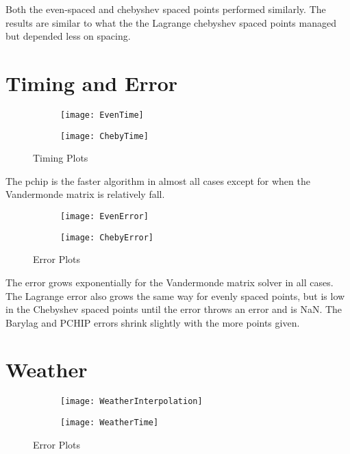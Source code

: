 \documentclass{article}
\begin{document}
Both the even-spaced and chebyshev spaced points performed similarly. The results are similar to what the the Lagrange chebyshev spaced points managed but depended less on spacing. 


\section{Timing and Error}


\begin{figure}[h!]
	\begin{subfigure}{\textwidth}
		  \centering
		  \texttt{[image: EvenTime]}
	\end{subfigure}
	
	
	\begin{subfigure}{\textwidth}
		  \centering
		  \texttt{[image: ChebyTime]}
	\end{subfigure}
	
	
	\caption{Timing Plots}
	\label{fig:Time}
\end{figure}

The pchip is the faster algorithm in almost all cases except for when the Vandermonde matrix is relatively fall.

\begin{figure}[h!]
	\begin{subfigure}{\textwidth}
		  \centering
		  \texttt{[image: EvenError]}
	\end{subfigure}
	
	
	\begin{subfigure}{\textwidth}
		  \centering
		  \texttt{[image: ChebyError]}
	\end{subfigure}
	
	
	\caption{Error Plots}
	\label{fig:Error}
\end{figure}

The error grows exponentially for the Vandermonde matrix solver in all cases. The Lagrange error also grows the same way for evenly spaced points, but is low in the Chebyshev spaced points until the error throws an error and is NaN. The Barylag and PCHIP errors shrink slightly with the more points given. 


\section{Weather}



\begin{figure}[h!]
	\begin{subfigure}{\textwidth}
		  \centering
		  \texttt{[image: WeatherInterpolation]}
	\end{subfigure}
	
	
	\begin{subfigure}{\textwidth}
		  \centering
		  \texttt{[image: WeatherTime]}
	\end{subfigure}
	
	
	\caption{Error Plots}
	\label{fig:Error}
\end{figure}
\end{document}
